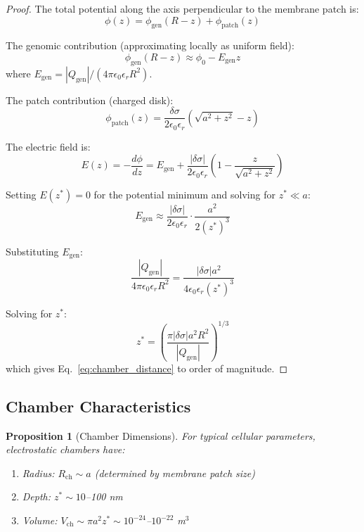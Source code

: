 \documentclass[twocolumn,10pt,aps,prd,superscriptaddress,floatfix,nofootinbib]{revtex4-2}
\newtheorem{proposition}[theorem]{Proposition}
\theoremstyle{remark}
\newcommand{\Qgen}{Q_{\mathrm{gen}}}
\newcommand{\Rcham}{R_{\mathrm{ch}}}
\begin{document}
\begin{proof}
The total potential along the axis perpendicular to the membrane patch is:
\begin{equation}
\phi(z) = \phi_{\mathrm{gen}}(R-z) + \phi_{\mathrm{patch}}(z)
\end{equation}

The genomic contribution (approximating locally as uniform field):
\begin{equation}
\phi_{\mathrm{gen}}(R-z) \approx \phi_0 - E_{\mathrm{gen}} z
\end{equation}
where $E_{\mathrm{gen}} = |\Qgen|/(4\pi\epsilon_0\epsilon_r R^2)$.

The patch contribution (charged disk):
\begin{equation}
\phi_{\mathrm{patch}}(z) = \frac{\delta\sigma}{2\epsilon_0\epsilon_r}\left(\sqrt{a^2 + z^2} - z\right)
\end{equation}

The electric field is:
\begin{equation}
E(z) = -\frac{d\phi}{dz} = E_{\mathrm{gen}} + \frac{|\delta\sigma|}{2\epsilon_0\epsilon_r}\left(1 - \frac{z}{\sqrt{a^2 + z^2}}\right)
\end{equation}

Setting $E(z^*) = 0$ for the potential minimum and solving for $z^* \ll a$:
\begin{equation}
E_{\mathrm{gen}} \approx \frac{|\delta\sigma|}{2\epsilon_0\epsilon_r} \cdot \frac{a^2}{2(z^*)^3}
\end{equation}

Substituting $E_{\mathrm{gen}}$:
\begin{equation}
\frac{|\Qgen|}{4\pi\epsilon_0\epsilon_r R^2} = \frac{|\delta\sigma| a^2}{4\epsilon_0\epsilon_r (z^*)^3}
\end{equation}

Solving for $z^*$:
\begin{equation}
z^* = \left(\frac{\pi |\delta\sigma| a^2 R^2}{|\Qgen|}\right)^{1/3}
\end{equation}
which gives Eq.~\eqref{eq:chamber_distance} to order of magnitude.
\end{proof}

\subsection{Chamber Characteristics}

\begin{proposition}[Chamber Dimensions]
\label{prop:chamber_dims}
For typical cellular parameters, electrostatic chambers have:
\begin{enumerate}
\item Radius: $\Rcham \sim a$ (determined by membrane patch size)
\item Depth: $z^* \sim 10$--100 nm
\item Volume: $V_{\mathrm{ch}} \sim \pi a^2 z^* \sim 10^{-24}$--$10^{-22}$ m$^3$
\end{enumerate}
\end{proposition}
\end{document}

